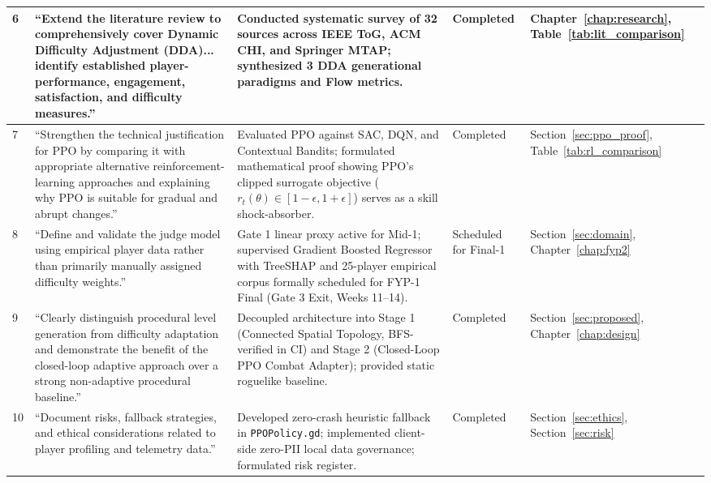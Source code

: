 \begin{longtable}{p{}p{}p{}p{}p{}}
6 & ``Extend the literature review to comprehensively cover Dynamic Difficulty Adjustment (DDA)... identify established player-performance, engagement, satisfaction, and difficulty measures.'' & Conducted systematic survey of 32 sources across IEEE ToG, ACM CHI, and Springer MTAP; synthesized 3 DDA generational paradigms and Flow metrics. & Completed & Chapter~\ref{chap:research}, Table~\ref{tab:lit_comparison} \\
\midrule
7 & ``Strengthen the technical justification for PPO by comparing it with appropriate alternative reinforcement-learning approaches and explaining why PPO is suitable for gradual and abrupt changes.'' & Evaluated PPO against SAC, DQN, and Contextual Bandits; formulated mathematical proof showing PPO's clipped surrogate objective ($r_t(\theta) \in [1-\epsilon, 1+\epsilon]$) serves as a skill shock-absorber. & Completed & Section~\ref{sec:ppo_proof}, Table~\ref{tab:rl_comparison} \\
\midrule
8 & ``Define and validate the judge model using empirical player data rather than primarily manually assigned difficulty weights.'' & Gate 1 linear proxy active for Mid-1; supervised Gradient Boosted Regressor with TreeSHAP and 25-player empirical corpus formally scheduled for FYP-1 Final (Gate 3 Exit, Weeks 11--14). & Scheduled for Final-1 & Section~\ref{sec:domain}, Chapter~\ref{chap:fyp2} \\
\midrule
9 & ``Clearly distinguish procedural level generation from difficulty adaptation and demonstrate the benefit of the closed-loop adaptive approach over a strong non-adaptive procedural baseline.'' & Decoupled architecture into Stage 1 (Connected Spatial Topology, BFS-verified in CI) and Stage 2 (Closed-Loop PPO Combat Adapter); provided static roguelike baseline. & Completed & Section~\ref{sec:proposed}, Chapter~\ref{chap:design} \\
\midrule
10 & ``Document risks, fallback strategies, and ethical considerations related to player profiling and telemetry data.'' & Developed zero-crash heuristic fallback in \texttt{PPOPolicy.gd}; implemented client-side zero-PII local data governance; formulated risk register. & Completed & Section~\ref{sec:ethics}, Section~\ref{sec:risk} \\
\bottomrule
\end{longtable}
